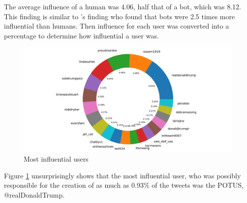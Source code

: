 \documentclass[letterpaper]{article}
\begin{document}
The average influence of a human was 4.06, half that of a bot, which was 8.12. This finding is similar to 
\cite{rizoiu2018debatenight}'s finding who found that bots were 2.5 times more influential than humans. Then influence for each user was converted 
into a percentage to determine how influential a user was. 

\begin{figure}[h!]
    \includegraphics[width=\linewidth]{images/top_influences.png}
    \caption{Most influential users}
    \label{fig:humans_bots_percentage}
\end{figure}

Figure \ref{fig:humans_bots_percentage} unsurprisingly shows that the most influential user, who was possibly responsible for the creation of as much as 0.93\%
of the tweets was the POTUS, @realDonaldTrump.\par
\end{document}
